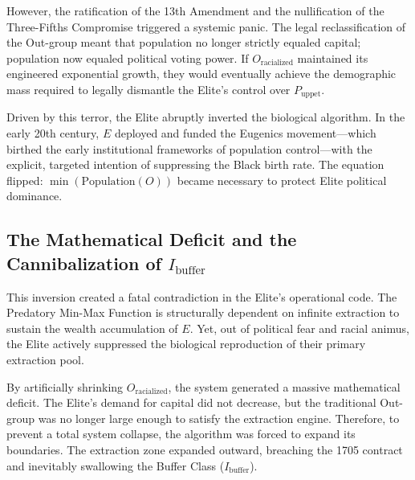 \documentclass[12pt,openany]{book}
\begin{document}
However, the ratification of the 13th Amendment and the nullification of the Three-Fifths Compromise triggered a systemic panic. The legal reclassification of the Out-group meant that population no longer strictly equaled capital; population now equaled political voting power. If $O_{\text{racialized}}$ maintained its engineered exponential growth, they would eventually achieve the demographic mass required to legally dismantle the Elite's control over $P_{\text{uppet}}$.

Driven by this terror, the Elite abruptly inverted the biological algorithm. In the early 20th century, $E$ deployed and funded the Eugenics movement---which birthed the early institutional frameworks of population control---with the explicit, targeted intention of suppressing the Black birth rate. The equation flipped: $\min(\text{Population}(O))$ became necessary to protect Elite political dominance.

\subsection{The Mathematical Deficit and the Cannibalization of \texorpdfstring{$I_{\text{buffer}}$}{I\_buffer}}

This inversion created a fatal contradiction in the Elite's operational code. The Predatory Min-Max Function is structurally dependent on infinite extraction to sustain the wealth accumulation of $E$. Yet, out of political fear and racial animus, the Elite actively suppressed the biological reproduction of their primary extraction pool.

By artificially shrinking $O_{\text{racialized}}$, the system generated a massive mathematical deficit. The Elite's demand for capital did not decrease, but the traditional Out-group was no longer large enough to satisfy the extraction engine. Therefore, to prevent a total system collapse, the algorithm was forced to expand its boundaries. The extraction zone expanded outward, breaching the 1705 contract and inevitably swallowing the Buffer Class ($I_{\text{buffer}}$).
\end{document}
